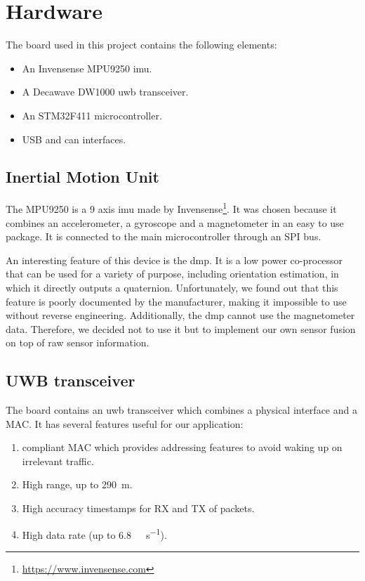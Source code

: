 \documentclass[a4paper, 12pt]{scrreprt}
\begin{document}

\chapter{Hardware}

The board used in this project contains the following elements:

\begin{itemize}
    \item An Invensense MPU9250 \gls{imu}.
    \item A Decawave DW1000 \gls{uwb} transceiver.
    \item An STM32F411 microcontroller.
    \item USB and \gls{can} interfaces.
\end{itemize}

\section{Inertial Motion Unit}

The MPU9250 is a 9 axis \gls{imu} made by Invensense\footnote{\url{https://www.invensense.com}}.
It was chosen because it combines an accelerometer, a gyroscope and a magnetometer in an easy to use package.
It is connected to the main microcontroller through an SPI bus.

An interesting feature of this device is the \gls{dmp}.
It is a low power co-processor that can be used for a variety of purpose, including orientation estimation, in which it directly outputs a quaternion.
Unfortunately, we found out that this feature is poorly documented by the manufacturer, making it impossible to use without reverse engineering.
Additionally, the \gls{dmp} cannot use the magnetometer data.
Therefore, we decided not to use it but to implement our own sensor fusion on top of raw sensor information.

\section{UWB transceiver}
The board contains an \gls{uwb} transceiver which combines a physical interface and a MAC.
It has several features useful for our application:
\begin{enumerate}
    \item \ieeepan{} compliant MAC which provides addressing features to avoid waking up on irrelevant traffic.
    \item High range, up to \SI{290}{\meter}.
    \item High accuracy timestamps for RX and TX of packets.
    \item High data rate (up to \SI{6.8}{\mega\bit\per\second}).
    \end{enumerate}
\end{document}
